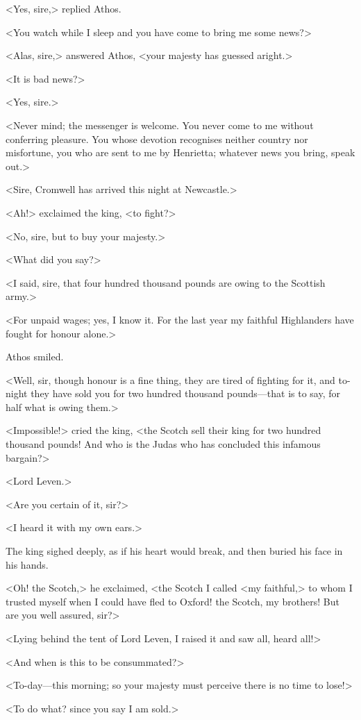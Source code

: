 <Yes, sire,> replied Athos.

<You watch while I sleep and you have come to bring me some news?>

<Alas, sire,> answered Athos, <your majesty has guessed aright.>

<It is bad news?>

<Yes, sire.>

<Never mind; the messenger is welcome. You never come to me without conferring pleasure. You whose devotion recognises neither country nor misfortune, you who are sent to me by Henrietta; whatever news you bring, speak out.>

<Sire, Cromwell has arrived this night at Newcastle.>

<Ah!> exclaimed the king, <to fight?>

<No, sire, but to buy your majesty.>

<What did you say?>

<I said, sire, that four hundred thousand pounds are owing to the Scottish army.>

<For unpaid wages; yes, I know it. For the last year my faithful Highlanders have fought for honour alone.>

Athos smiled.

<Well, sir, though honour is a fine thing, they are tired of fighting for it, and to-night they have sold you for two hundred thousand pounds—that is to say, for half what is owing them.>

<Impossible!> cried the king, <the Scotch sell their king for two hundred thousand pounds! And who is the Judas who has concluded this infamous bargain?>

<Lord Leven.>

<Are you certain of it, sir?>

<I heard it with my own ears.>

The king sighed deeply, as if his heart would break, and then buried his face in his hands.

<Oh! the Scotch,> he exclaimed, <the Scotch I called <my faithful,> to whom I trusted myself when I could have fled to Oxford! the Scotch, my brothers! But are you well assured, sir?>

<Lying behind the tent of Lord Leven, I raised it and saw all, heard all!>

<And when is this to be consummated?>

<To-day—this morning; so your majesty must perceive there is no time to lose!>

<To do what? since you say I am sold.>

